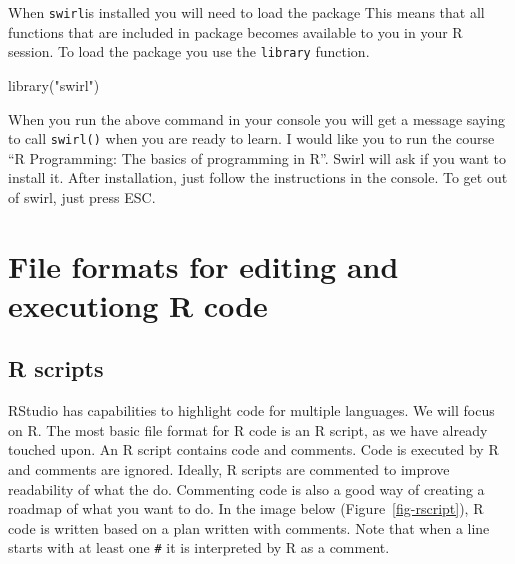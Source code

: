 \documentclass[
  11pt,
  letterpaper,
]{scrbook}
\newenvironment{Shaded}{\begin{snugshade}}{\end{snugshade}}
\newcommand{\FunctionTok}[1]{\textcolor[rgb]{0.28,0.35,0.67}{#1}}
\newcommand{\NormalTok}[1]{\textcolor[rgb]{0.00,0.23,0.31}{#1}}
\newcommand{\StringTok}[1]{\textcolor[rgb]{0.13,0.47,0.30}{#1}}
\begin{document}
When \texttt{swirl}is installed you will need to load the package This
means that all functions that are included in package becomes available
to you in your R session. To load the package you use the
\texttt{library} function.

\begin{Shaded}
\begin{Highlighting}[numbers=left,,]
\FunctionTok{library}\NormalTok{(}\StringTok{"swirl"}\NormalTok{)}
\end{Highlighting}
\end{Shaded}

When you run the above command in your console you will get a message
saying to call \texttt{swirl()} when you are ready to learn. I would
like you to run the course ``R Programming: The basics of programming in
R''. Swirl will ask if you want to install it. After installation, just
follow the instructions in the console. To get out of swirl, just press
ESC.

\hypertarget{file-formats-for-editing-and-executiong-r-code}{%
\section{File formats for editing and executiong R
code}\label{file-formats-for-editing-and-executiong-r-code}}

\hypertarget{r-scripts}{%
\subsection{R scripts}\label{r-scripts}}

RStudio has capabilities to highlight code for multiple languages. We
will focus on R. The most basic file format for R code is an R script,
as we have already touched upon. An R script contains code and comments.
Code is executed by R and comments are ignored. Ideally, R scripts are
commented to improve readability of what the do. Commenting code is also
a good way of creating a roadmap of what you want to do. In the image
below (Figure~\ref{fig-rscript}), R code is written based on a plan
written with comments. Note that when a line starts with at least one
\texttt{\#} it is interpreted by R as a comment.
\end{document}
